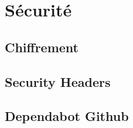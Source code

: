 \section{Sécurité}
\subsection{Chiffrement}
\subsection{Security Headers}
\subsection{Dependabot Github}